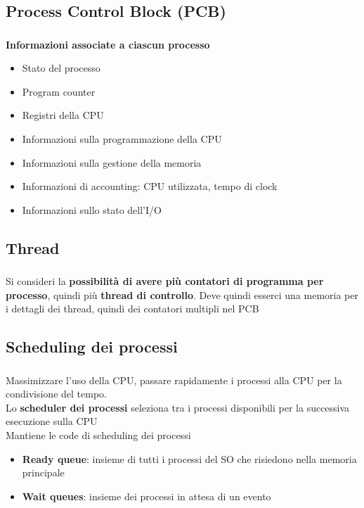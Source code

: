 \documentclass{beamer}
\newenvironment{mainframe}{
	\begin{frame}
		\frametitle{\insertsubsection}
		\framesubtitle{\insertsection}
	}{
	\end{frame}
}
\begin{document}
\subsection{Process Control Block (PCB)}
\begin{mainframe}
	\textbf{Informazioni associate a ciascun processo}
	\begin{itemize}
		\item Stato del processo
		\item Program counter
		\item Registri della CPU
		\item Informazioni sulla programmazione della CPU
		\item Informazioni sulla gestione della memoria
		\item Informazioni di accounting: CPU utilizzata, tempo di clock
		\item Informazioni sullo stato dell'I/O
	\end{itemize}
\end{mainframe}
\subsection{Thread}
\begin{mainframe}
	Si consideri la \textbf{possibilità di avere più contatori di programma per processo}, quindi più \textbf{thread di controllo}. Deve quindi esserci una memoria per i dettagli dei thread, quindi dei contatori multipli nel PCB
\end{mainframe}
\subsection{Scheduling dei processi}
\begin{mainframe}
	Massimizzare l'uso della CPU, passare rapidamente i processi alla CPU per la condivisione del tempo.\\
	Lo \textbf{scheduler dei processi} seleziona tra i processi disponibili per la successiva esecuzione sulla CPU\\
	Mantiene le code di scheduling dei processi
	\begin{itemize}
		\item \textbf{Ready queue}: insieme di tutti i processi del SO che risiedono nella memoria principale
		\item \textbf{Wait queues}: insieme dei processi in attesa di un evento
	\end{itemize}
\end{mainframe}
\end{document}
